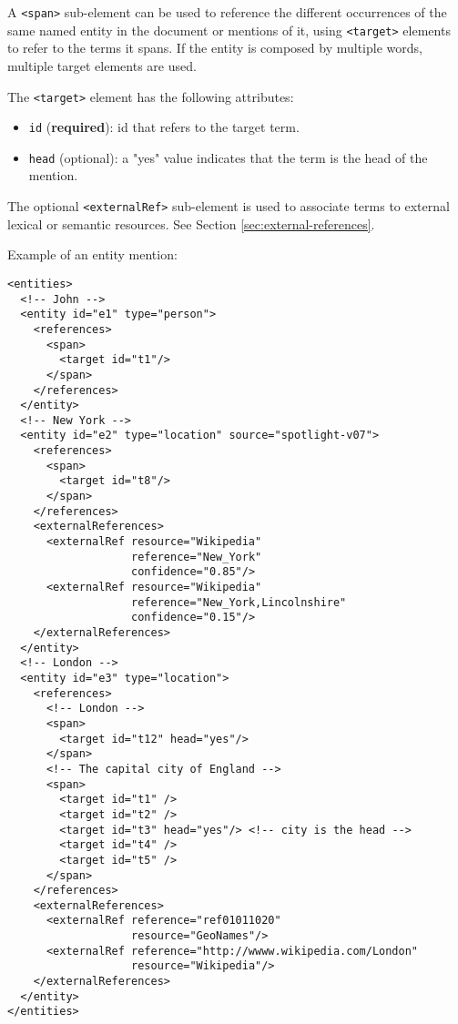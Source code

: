 A \texttt{<span>} sub-element can be used to reference the different
occurrences of the same named entity in the document or mentions of it,
using \texttt{<target>} elements to refer to the terms it spans. If the
entity is composed by multiple words, multiple target elements are used.

The \texttt{<target>} element has the following attributes:
\begin{itemize}
\item \texttt{id} (\textbf{required}): id that refers to the target term.
\item \texttt{head} (optional): a "yes" value indicates that the term is the
  head of the mention.
\end{itemize}

The optional \texttt{<externalRef>} sub-element is used to associate terms
to external lexical or semantic resources. See Section
\ref{sec:external-references}.

Example of an entity mention:

\begin{Verbatim}[fontsize=\small]
<entities>
  <!-- John -->
  <entity id="e1" type="person">
    <references>
      <span>
        <target id="t1"/>
      </span>
    </references>
  </entity>
  <!-- New York -->
  <entity id="e2" type="location" source="spotlight-v07">
    <references>
      <span>
        <target id="t8"/>
      </span>
    </references>
    <externalReferences>
      <externalRef resource="Wikipedia"
                   reference="New_York"
                   confidence="0.85"/>
      <externalRef resource="Wikipedia"
                   reference="New_York,Lincolnshire"
                   confidence="0.15"/>
    </externalReferences>
  </entity>
  <!-- London -->
  <entity id="e3" type="location">
    <references>
      <!-- London -->
      <span>
        <target id="t12" head="yes"/>
      </span>
      <!-- The capital city of England -->
      <span>
        <target id="t1" />
        <target id="t2" />
        <target id="t3" head="yes"/> <!-- city is the head -->
        <target id="t4" />
        <target id="t5" />
      </span>
    </references>
    <externalReferences>
      <externalRef reference="ref01011020" 
                   resource="GeoNames"/>
      <externalRef reference="http://wwww.wikipedia.com/London" 
                   resource="Wikipedia"/>
    </externalReferences>
  </entity>
</entities>
\end{Verbatim}


